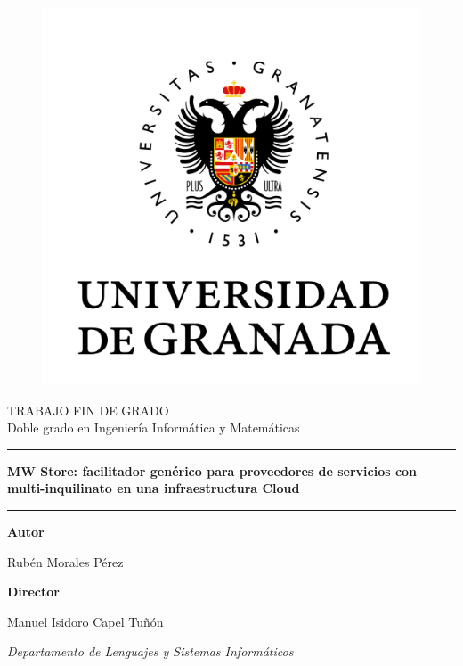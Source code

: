 \documentclass[12pt,english]{article} %
\title{  } %
\author{ }
\date{ } %
\begin{document}
\begin{figure}[H]
  \centering
  \includegraphics[scale=0.4]{img/logo_ugr.png}
\end{figure}

\begin{center}
  \Large TRABAJO FIN DE GRADO\\ 
  \large Doble grado en Ingeniería Informática y Matemáticas
  \vspace{0.7cm}

  \hrule
  \vspace{0.2cm}
  \textbf{\LARGE MW Store: facilitador genérico para proveedores de servicios con multi-inquilinato en una infraestructura Cloud}
  \vspace{0.2cm}
  \hrule
  \vspace{2cm}
  
  \textbf{Autor}

  Rubén Morales Pérez

  \vspace{2cm}
  \textbf{Director}

  Manuel Isidoro Capel Tuñón

  \textit{Departamento de Lenguajes y Sistemas Informáticos}
\end{center}

\newpage

\ 
\thispagestyle{empty}
\end{document}
